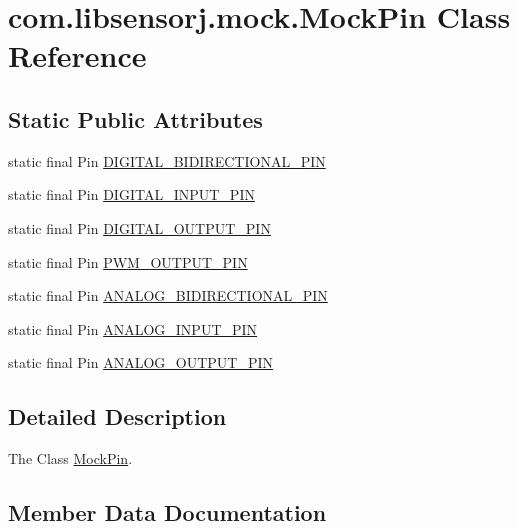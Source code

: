 \hypertarget{classcom_1_1libsensorj_1_1mock_1_1MockPin}{}\section{com.\+libsensorj.\+mock.\+Mock\+Pin Class Reference}
\label{classcom_1_1libsensorj_1_1mock_1_1MockPin}
\subsection*{Static Public Attributes}
\begin{DoxyCompactItemize}
\item 
static final Pin \hyperlink{classcom_1_1libsensorj_1_1mock_1_1MockPin_a4dc35775be540ac9c62c2797c08a7ed7}{D\+I\+G\+I\+T\+A\+L\+\_\+\+B\+I\+D\+I\+R\+E\+C\+T\+I\+O\+N\+A\+L\+\_\+\+P\+I\+N}
\item 
static final Pin \hyperlink{classcom_1_1libsensorj_1_1mock_1_1MockPin_ab3330359048ec50eec255e0ab6309f48}{D\+I\+G\+I\+T\+A\+L\+\_\+\+I\+N\+P\+U\+T\+\_\+\+P\+I\+N}
\item 
static final Pin \hyperlink{classcom_1_1libsensorj_1_1mock_1_1MockPin_ae16d327cdbddbbdeb9314b6b28a52e82}{D\+I\+G\+I\+T\+A\+L\+\_\+\+O\+U\+T\+P\+U\+T\+\_\+\+P\+I\+N}
\item 
static final Pin \hyperlink{classcom_1_1libsensorj_1_1mock_1_1MockPin_af15fcc7a04ad7751ca96f968d1ac1b91}{P\+W\+M\+\_\+\+O\+U\+T\+P\+U\+T\+\_\+\+P\+I\+N}
\item 
static final Pin \hyperlink{classcom_1_1libsensorj_1_1mock_1_1MockPin_a09976649e41290f5aa6c0d61fee67eda}{A\+N\+A\+L\+O\+G\+\_\+\+B\+I\+D\+I\+R\+E\+C\+T\+I\+O\+N\+A\+L\+\_\+\+P\+I\+N}
\item 
static final Pin \hyperlink{classcom_1_1libsensorj_1_1mock_1_1MockPin_a3ca873ea424dac948fabb4c2249ea0a3}{A\+N\+A\+L\+O\+G\+\_\+\+I\+N\+P\+U\+T\+\_\+\+P\+I\+N}
\item 
static final Pin \hyperlink{classcom_1_1libsensorj_1_1mock_1_1MockPin_ac0cb98f53fad4d229f1999253428e252}{A\+N\+A\+L\+O\+G\+\_\+\+O\+U\+T\+P\+U\+T\+\_\+\+P\+I\+N}
\end{DoxyCompactItemize}


\subsection{Detailed Description}
The Class \hyperlink{classcom_1_1libsensorj_1_1mock_1_1MockPin}{Mock\+Pin}. 

\subsection{Member Data Documentation}
\hypertarget{classcom_1_1libsensorj_1_1mock_1_1MockPin_a09976649e41290f5aa6c0d61fee67eda}{}
